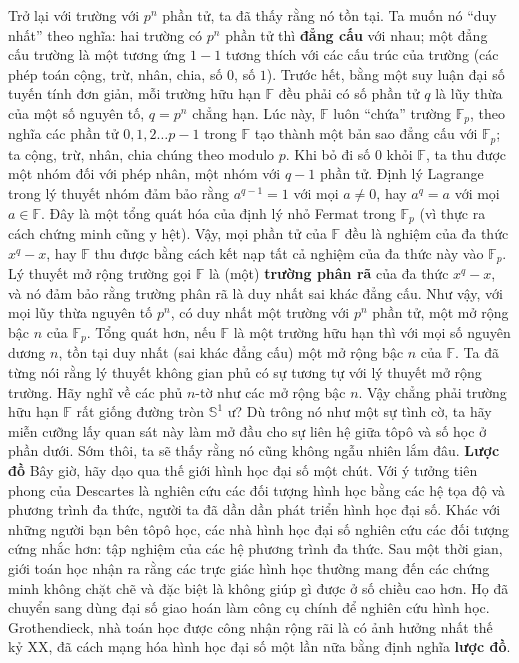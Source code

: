 \begin{multicols}{2}
	\vskip 0.1cm
	Trở lại với trường với $p^n$ phần tử, ta đã thấy rằng nó tồn tại. Ta muốn nó ``duy nhất'' theo nghĩa: hai trường có $p^n$ phần tử thì {\bf\color{duongvaotoanhoc} đẳng cấu} với nhau; một đẳng cấu trường là một tương ứng $1-1$ tương thích với các cấu trúc của trường (các phép toán cộng, trừ, nhân, chia, số $0$, số $1$). Trước hết, bằng một suy luận đại số tuyến tính đơn giản, mỗi trường hữu hạn $\mathbb{F}$ đều phải có số phần tử $q$ là lũy thừa của một số nguyên tố, $q = p^n$ chẳng hạn. Lúc này, $\mathbb{F}$ luôn ``chứa'' trường $\mathbb{F}_p$, theo nghĩa các phần tử $0,1,2 \ldots p-1$ trong $\mathbb{F}$ tạo thành một bản sao đẳng cấu với $\mathbb{F}_p$; ta cộng, trừ, nhân, chia chúng theo modulo $p$. Khi bỏ đi số $0$ khỏi $\mathbb{F}$, ta thu được một nhóm đối với phép nhân, một nhóm với $q-1$ phần tử. Định lý Lagrange trong lý thuyết nhóm đảm bảo rằng $a^{q-1} = 1$ với mọi $a \neq 0$, hay $a^q = a$ với mọi $a \in \mathbb{F}$. Đây là một tổng quát hóa của định lý nhỏ Fermat trong $\mathbb{F}_p$ (vì thực ra cách chứng minh cũng y hệt). Vậy, mọi phần tử của $\mathbb{F}$ đều là nghiệm của đa thức $x^q - x$, hay $\mathbb{F}$ thu được bằng cách kết nạp tất cả nghiệm của đa thức này vào $\mathbb{F}_p$. Lý thuyết mở rộng trường gọi $\mathbb{F}$ là (một) {\bf\color{duongvaotoanhoc} trường phân rã} của đa thức $x^q - x$, và nó đảm bảo rằng trường phân rã là duy nhất sai khác đẳng cấu. Như vậy, với mọi lũy thừa nguyên tố $p^n$, có duy nhất một trường với $p^n$ phần tử, một mở rộng bậc $n$ của $\mathbb{F}_p$.
	\vskip 0.1cm
	Tổng quát hơn, nếu $\mathbb{F}$ là một trường hữu hạn thì với mọi số nguyên dương $n$, tồn tại duy nhất (sai khác đẳng cấu) một mở rộng bậc $n$ của $\mathbb{F}$. Ta đã từng nói rằng lý thuyết không gian phủ có sự tương tự với lý thuyết mở rộng trường. Hãy nghĩ về các phủ $n$-tờ như các mở rộng bậc $n$. Vậy chẳng phải trường hữu hạn $\mathbb{F}$ rất giống đường tròn $\mathbb{S}^1$ ư? Dù trông nó như một sự tình cờ, ta hãy miễn cưỡng lấy quan sát này làm mở đầu cho sự liên hệ giữa tôpô và số học ở phần dưới. Sớm thôi, ta sẽ thấy rằng nó cũng không ngẫu nhiên lắm đâu.
	\vskip 0.1cm
	\textbf{\color{duongvaotoanhoc}Lược đồ}
	\vskip 0.1cm
	Bây giờ, hãy dạo qua thế giới hình học đại số một chút. Với ý tưởng tiên phong của Descartes là nghiên cứu các đối tượng hình học bằng các hệ tọa độ và phương trình đa thức, người ta đã dần dần phát triển hình học đại số. Khác với những người bạn bên tôpô học, các nhà hình học đại số nghiên cứu các đối tượng cứng nhắc hơn: tập nghiệm của các hệ phương trình đa thức. Sau một thời gian, giới toán học nhận ra rằng các trực giác hình học thường mang đến các chứng minh không chặt chẽ và đặc biệt là không giúp gì được ở số chiều cao hơn. Họ đã chuyển sang dùng đại số giao hoán làm công cụ chính để nghiên cứu hình học. Grothendieck, nhà toán học được công nhận rộng rãi là có ảnh hưởng nhất thế kỷ XX, đã cách mạng hóa hình học đại số một lần nữa bằng định nghĩa {\bf\color{duongvaotoanhoc} lược đồ}.

\end{multicols}
